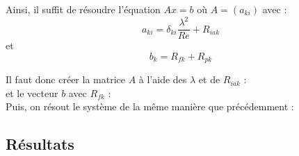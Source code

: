 Ainsi, il suffit de résoudre l'équation $Ax=b$ où $A=(a_{ki})$ avec :
\[ a_{ki} = \delta_{ki}\frac{\lambda^2}{Re} + R_{iak} \]
et
\[ b_k = R_{fk} + R_{pk} \]

Il faut donc créer la matrice $A$ à l'aide des $\lambda$ et de $R_{iak}$ :\\

et le vecteur $b$ avec $R_{fk}$ :\\


Puis, on résout le système de la même manière que précédemment :\\


\subsection{Résultats}



